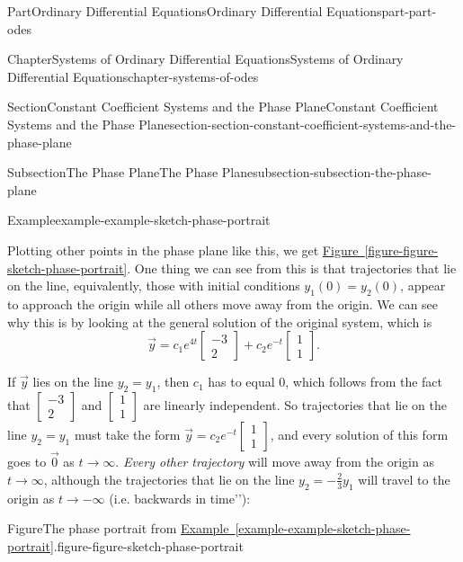 \documentclass[twoside,10pt,]{book}
\newcommand{\xreffont}{\relax}
\numberwithin{equation}{part}
\begin{document}
\begin{partptx}{Part}{Ordinary Differential Equations}{}{Ordinary Differential Equations}{}{}{part-part-odes}
\begin{chapterptx}{Chapter}{Systems of Ordinary Differential Equations}{}{Systems of Ordinary Differential Equations}{}{}{chapter-systems-of-odes}
\begin{sectionptx}{Section}{Constant Coefficient Systems and the Phase Plane}{}{Constant Coefficient Systems and the Phase Plane}{}{}{section-section-constant-coefficient-systems-and-the-phase-plane}
\begin{subsectionptx}{Subsection}{The Phase Plane}{}{The Phase Plane}{}{}{subsection-subsection-the-phase-plane}
\begin{example}{Example}{}{example-example-sketch-phase-portrait}
\par
Plotting other points in the phase plane like this, we get \hyperref[figure-figure-sketch-phase-portrait]{Figure~{\xreffont\ref{figure-figure-sketch-phase-portrait}}}. One thing we can see from this is that trajectories that lie on the line, equivalently, those with initial conditions \(y_{1}(0) = y_{2}(0)\), appear to approach the origin while all others move away from the origin. We can see why this is by looking at the general solution of the original system, which is%
\begin{equation*}
\vec{y} = c_{1}e^{4t}\begin{bmatrix}-3\\2\end{bmatrix}+c_{2}e^{-t}\begin{bmatrix}1\\1\end{bmatrix}.
\end{equation*}
%
\par
If \(\vec{y}\) lies on the line \(y_{2} = y_{1}\), then \(c_{1}\) has to equal \(0\), which follows from the fact that \(\begin{bmatrix}-3\\2\end{bmatrix}\) and \(\begin{bmatrix}1\\1\end{bmatrix}\) are linearly independent. So trajectories that lie on the line \(y_{2} = y_{1}\) must take the form \(\vec{y} = c_{2}e^{-t}\begin{bmatrix}1\\1\end{bmatrix}\), and every solution of this form goes to \(\vec{0}\) as \(t\to\infty\). \emph{Every other trajectory} will move away from the origin as \(t\to\infty\), although the trajectories that lie on the line \(y_{2} = -\frac{2}{3}y_{1}\) will travel to the origin as \(t\to-\infty\) (i.e. \textasciigrave{}\textasciigrave{}backwards in time'{}'{}):%
\end{example}
\begin{figureptx}{Figure}{The phase portrait from \hyperref[example-example-sketch-phase-portrait]{Example~{\xreffont\ref{example-example-sketch-phase-portrait}}}.}{figure-figure-sketch-phase-portrait}{}%
\begin{image}{0.25}{0.5}{0.25}{}%

\end{image}
\end{figureptx}
\end{subsectionptx}
\end{sectionptx}
\end{chapterptx}
\end{partptx}
\end{document}

